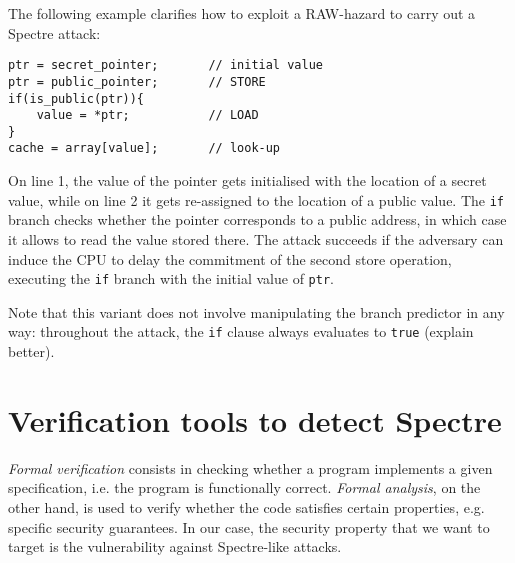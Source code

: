 \documentclass[12pt,a4paper]{book}
\theoremstyle{definition}
\begin{document}
	The following example clarifies how to exploit a RAW-hazard to carry out a Spectre attack:
	\begin{lstlisting}
ptr = secret_pointer;		// initial value
ptr = public_pointer;		// STORE
if(is_public(ptr)){	
	value = *ptr;			// LOAD
}
cache = array[value];		// look-up
	\end{lstlisting}
	On line 1, the value of the pointer gets initialised with the location of a secret value, while on line 2 it gets re-assigned to the location of a public value. The \texttt{if} branch checks whether the pointer corresponds to a public address, in which case it allows to read the value stored there. The attack succeeds if the adversary can induce the CPU to delay the commitment of the second store operation, executing the \texttt{if} branch with the initial value of \texttt{ptr}.
	
	Note that this variant does not involve manipulating the branch predictor in any way: throughout the attack, the \texttt{if} clause always evaluates to \texttt{true} (explain better).
	
	\chapter{Verification tools to detect Spectre}\label{chapter:verification}
	
	\textit{Formal verification} consists in checking whether a program implements a given specification, i.e. the program is functionally correct. \textit{Formal analysis}, on the other hand, is used to verify whether the code satisfies certain properties, e.g. specific security guarantees. In our case, the security property that we want to target is the vulnerability against Spectre-like attacks. 
	
\end{document}
